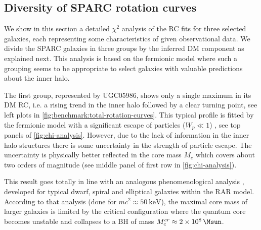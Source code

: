 \subsection[Best-fit analysis]{Diversity of SPARC rotation curves}
\label{sec:result:limitations}

We show in this section a detailed $\chi^2$ analysis of the RC fits for three selected galaxies, each representing some characteristics of given observational data. We divide the SPARC galaxies in three groups by the inferred DM component as explained next. This analysis is based on the fermionic model where such a grouping seems to be appropriate to select galaxies with valuable predictions about the inner halo.

The first group, represented by UGC05986, shows only a single maximum in its DM RC, i.e. a rising trend in the inner halo followed by a clear turning point, see left plots in \cref{fig:benchmark:total-rotation-curves}. This typical profile is  fitted by the fermionic model with a significant escape of particles ($W_p \ll 1$) , see  top panels of \cref{fig:chi-analysis}. However, due to the lack of information in the inner halo structures there is some uncertainty in the strength of particle escape. The uncertainty is physically better reflected in the core mass $M_c$ which covers about two orders of magnitude (see middle panel of first row in \cref{fig:chi-analysis}).


This result goes totally in line with an analogous phenomenological analysis \citep{2019PDU....24..278A}, developed for typical dwarf, spiral and elliptical galaxies within the RAR model. According to that analysis (done for $mc^2\approx \SI{50}{\kilo\eV}$), the maximal core mass of larger galaxies is limited by the critical configuration where the quantum core becomes unstable and collapses to a BH of mass $M_c^{cr} \approx \SI{2E8}{\Msun}$. %

